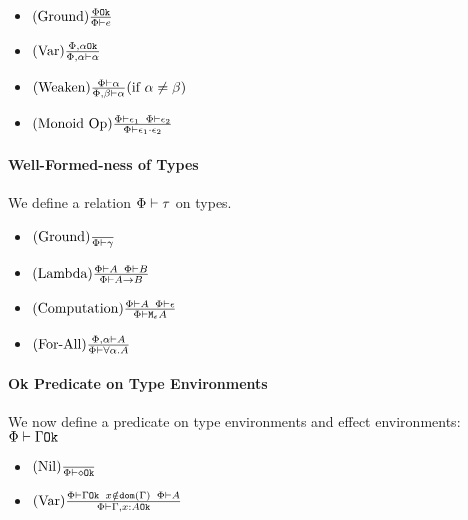 {\begin{itemize}
    \item $(\text{Ground}) \frac{\Phi \texttt{Ok}}{\Phi\vdash e}$
    \item $(\text{Var}) \frac{\Phi,\alpha \texttt{Ok}}{\Phi,\alpha\vdash \alpha}$
    \item $(\text{Weaken}) \frac{\Phi\vdash \alpha}{\Phi,\beta\vdash \alpha}(\text{if } \alpha\neq\beta)$
    \item $(\text{Monoid Op}) \frac{\Phi\vdash \epsilon_1\;\;\Phi\vdash \epsilon_2}{\Phi\vdash \epsilon_1\cdot\epsilon_2}$
\end{itemize}

\paragraph{Well-Formed-ness of Types}
We define a relation $\Phi\vdash \tau$ on types.

\begin{itemize}
    \item $(\text{Ground}) \frac{}{\Phi\vdash \gamma}$
    \item $(\text{Lambda}) \frac{\Phi\vdash A\;\;\Phi\vdash B}{\Phi\vdash A\rightarrow B}$
    \item $(\text{Computation}) \frac{\Phi\vdash A\;\;\Phi\vdash \epsilon}{\Phi\vdash \texttt{M}_{\epsilon}{A}}$
    \item $(\text{For-All}) \frac{\Phi,\alpha\vdash A}{\Phi\vdash \forall \alpha. A}$
\end{itemize}

\paragraph{Ok Predicate on Type Environments}
We now define a predicate on type environments and effect environments: $\Phi\vdash \Gamma \texttt{Ok}$

\begin{itemize}
    \item $(\text{Nil}) \frac{}{\Phi\vdash \diamond \texttt{Ok}}$
    \item $(\text{Var}) \frac{\Phi\vdash \Gamma \texttt{Ok}\;\; x\notin\texttt{dom}(\Gamma)\;\; \Phi\vdash A}{\Phi\vdash \Gamma, x: A \texttt{Ok}}$
\end{itemize}

}
